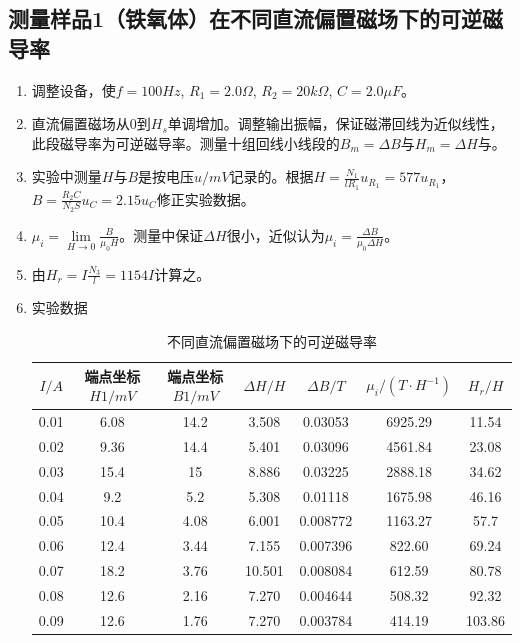\documentclass[11pt]{article}
\begin{document}
\subsection{测量样品1（铁氧体）在不同直流偏置磁场下的可逆磁导率}
\begin{enumerate}
    \item 调整设备，使$f=100Hz$, $R_1=2.0\Omega$, $R_2=20k\Omega$, $C=2.0\mu F$。
    \item 直流偏置磁场从0到$H_s$单调增加。调整输出振幅，保证磁滞回线为近似线性，此段磁导率为可逆磁导率。测量十组回线小线段的$B_m=\Delta B$与$H_m=\Delta H$与。
    \item 实验中测量$H$与$B$是按电压$u/mV$记录的。根据$H=\frac{N_1}{lR_1}u_{R_1}=577u_{R_1}$，$B=\frac{R_2C}{N_2S}u_C=2.15u_C$修正实验数据。
    \item $\mu_i=\lim\limits_{H\to 0} \frac{B}{\mu_0 H} $。测量中保证$\Delta H$很小，近似认为$\mu_i=\frac{\Delta B}{\mu_0 \Delta H} $。
    \item 由$H_r=I\frac{N_3}{l}=1154I$计算之。
    \item 实验数据
        \begin{table}[H]
          \centering
          \caption{不同直流偏置磁场下的可逆磁导率}
            \begin{tabular}{|c|c|c|c|c|c|c|}\hline
            $I/A$    & 端点坐标$H1/mV$     & 端点坐标$B1/mV$     & $\Delta H/H$      & $\Delta B/T$      & $\mu_i /(T\cdot H^{-1})$     & $H_r/H$ \\\hline
            0.01   & 6.08   & 14.2   & 3.508  & 0.03053 & 6925.29  & 11.54 \\\hline
            0.02   & 9.36   & 14.4   & 5.401  & 0.03096 & 4561.84  & 23.08 \\\hline
            0.03   & 15.4   & 15     & 8.886  & 0.03225 & 2888.18  & 34.62 \\\hline
            0.04   & 9.2    & 5.2    & 5.308  & 0.01118 & 1675.98  & 46.16 \\\hline
            0.05   & 10.4   & 4.08   & 6.001  & 0.008772 & 1163.27  & 57.7 \\\hline
            0.06   & 12.4   & 3.44   & 7.155  & 0.007396 & 822.60  & 69.24 \\\hline
            0.07   & 18.2   & 3.76   & 10.501  & 0.008084 & 612.59  & 80.78 \\\hline
            0.08   & 12.6   & 2.16   & 7.270  & 0.004644 & 508.32  & 92.32 \\\hline
            0.09   & 12.6   & 1.76   & 7.270  & 0.003784 & 414.19  & 103.86 \\\hline

\end{tabular}
\end{table}
\end{enumerate}
\end{document}

